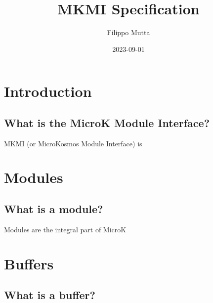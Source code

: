 \documentclass{report}
\title{MKMI Specification}
\date{2023-09-01}
\author{Filippo Mutta}
\begin{document}
\maketitle
\newpage


\tableofcontents

\chapter{Introduction}
\section{What is the MicroK Module Interface?}
MKMI (or MicroKosmos Module Interface) is 
\chapter{Modules}
\section{What is a module?}
Modules are the integral part of MicroK
\chapter{Buffers}
\section{What is a buffer?}
\end{document}
